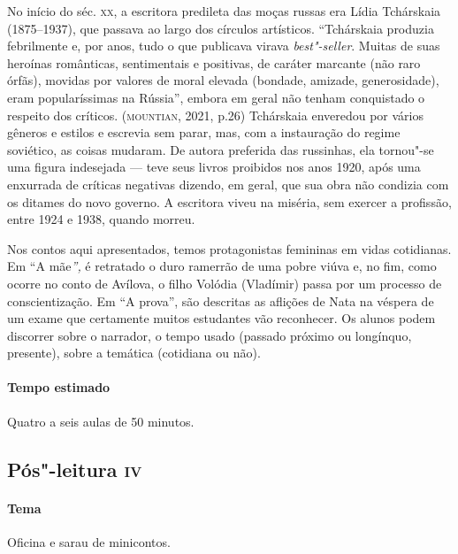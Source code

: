 \documentclass[11pt]{extarticle}
\begin{document}
No início do séc. \textsc{xx}, a escritora predileta das moças russas era Lídia
Tchárskaia (1875--1937), que passava ao largo dos círculos artísticos.
``Tchárskaia produzia febrilmente e, por anos, tudo o que publicava
virava \emph{best"-seller}. Muitas de suas heroínas românticas,
sentimentais e positivas, de caráter marcante (não raro órfãs), movidas
por valores de moral elevada (bondade, amizade, generosidade), eram
popularíssimas na Rússia'', embora em geral não tenham conquistado o
respeito dos críticos. (\textsc{mountian}, 2021, p.26) Tchárskaia enveredou por
vários gêneros e estilos e escrevia sem parar, mas, com a instauração do
regime soviético, as coisas mudaram. De autora preferida das russinhas,
ela tornou"-se uma figura indesejada --- teve seus livros proibidos nos
anos 1920, após uma enxurrada de críticas negativas dizendo, em geral,
que sua obra não condizia com os ditames do novo governo. A escritora
viveu na miséria, sem exercer a profissão, entre 1924 e 1938, quando
morreu.

Nos contos aqui apresentados, temos protagonistas femininas em vidas
cotidianas. Em ``A mãe\emph{'',} é retratado o duro ramerrão de uma
pobre viúva e, no fim, como ocorre no conto de Avílova, o filho Volódia
(Vladímir) passa por um processo de conscientização. Em ``A prova'', são
descritas as aflições de Nata na véspera de um exame que certamente
muitos estudantes vão reconhecer. Os alunos podem discorrer sobre o
narrador, o tempo usado (passado próximo ou longínquo, presente), sobre
a temática (cotidiana ou não).


\paragraph{Tempo estimado} Quatro a seis aulas de 50 minutos.

\subsection{Pós"-leitura \textsc{iv}}

\paragraph{Tema} Oficina e sarau de minicontos.
\end{document}
